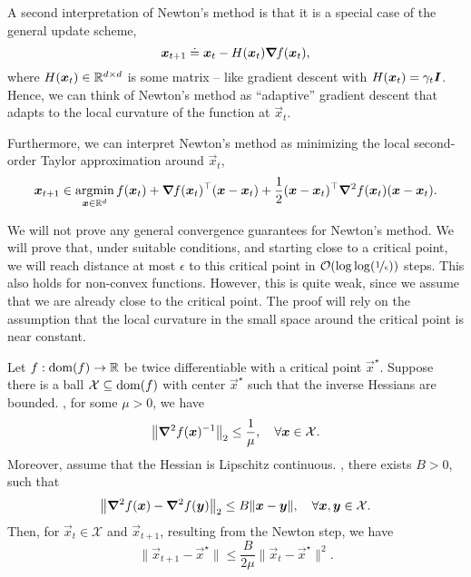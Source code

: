 A second interpretation of Newton's method is that it is a special case of the general update
scheme, \[
    \bm{x}_{t+1} \doteq \bm{x}_t - H(\bm{x}_t) \bm{\nabla}_{\! } f(\bm{x}_t),
\]
where $H(\bm{x}_t) \in \mathbb{R}^{d \times d}$ is some matrix -- like gradient descent with $H(\bm{x}_t)
    = \gamma_t \bm{I}$. Hence, we can think of Newton's method as ``adaptive'' gradient descent that
adapts to the local curvature of the function at $\vec{x}_t$.

Furthermore, we can interpret Newton's method as minimizing the local second-order Taylor
approximation around $\vec{x}_t$, \[
    \bm{x}_{t+1} \in \operatorname*{argmin}_{\bm{x} \in \mathbb{R}^d} f(\bm{x}_t) + \bm{\nabla}_{\! } f(\bm{x}_t)^\top(\bm{x} - \bm{x}_t) + \frac{1}{2} (\bm{x} - \bm{x}_t)^\top \bm{\nabla}^2_{\! } f(\bm{x}_t)(\bm{x} - \bm{x}_t).
\]

We will not prove any general convergence guarantees for Newton's method. We will prove that, under
suitable conditions, and starting close to a critical point, we will reach distance at most
$\epsilon$ to this critical point in $\bigo{\log \log(\nicefrac{1}{\epsilon})}$ steps. This also
holds for non-convex functions. However, this is quite weak, since we assume that we are already
close to the critical point. The proof will rely on the assumption that the local curvature in the
small space around the critical point is near constant.

\begin{theorem} \label{thm:newton}
    Let $f: \mathrm{dom}(f) \to \mathbb{R}$ be twice differentiable with a critical point $\vec{x}^\star$. Suppose
    there is a ball $\mathcal{X} \subseteq \mathrm{dom}(f)$ with center $\vec{x}^\star$ such that the inverse
    Hessians are bounded. \Ie, for some $\mu > 0$, we have \[
        \lft\| \inv{\hess{f(\vec{x})}{}} \rgt\|_2 \leq \frac{1}{\mu}, \quad \forall \vec{x} \in \mathcal{X}.
    \]
    Moreover, assume that the Hessian is Lipschitz continuous. \Ie, there exists $B > 0$, such that \[
        \lft\| \hess{f(\vec{x})}{} - \hess{f(\vec{y})}{} \rgt\|_2 \leq B \| \vec{x} - \vec{y} \|, \quad \forall \vec{x},\vec{y}\in \mathcal{X}.
    \]
    Then, for $\vec{x}_t \in \mathcal{X}$ and $\vec{x}_{t+1}$, resulting from the Newton step, we have \[
        \| \vec{x}_{t+1} - \vec{x}^\star \| \leq \frac{B}{2 \mu} \| \vec{x}_t - \vec{x}^\star \|^2.
    \]
\end{theorem}

